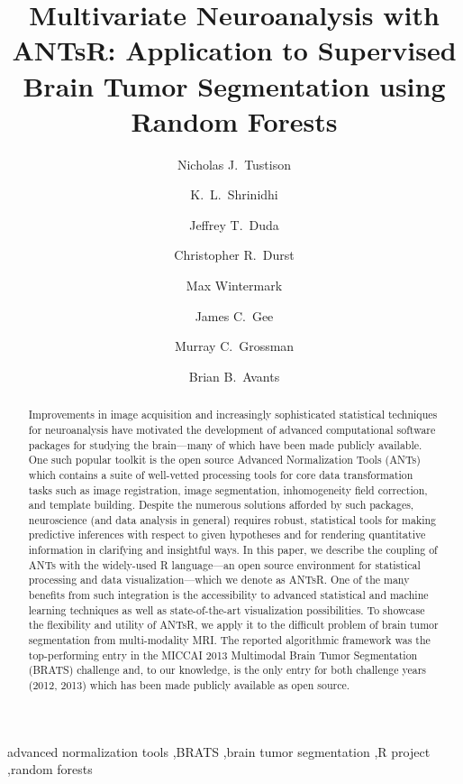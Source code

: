 \documentclass[final,5p,times,twocolumn]{elsarticle}
\begin{document}
\begin{frontmatter}

\title{Multivariate Neuroanalysis with ANTsR: Application to Supervised Brain Tumor Segmentation using Random Forests}

\author[label1]{Nicholas J.~Tustison
  }
\author[label2]{K.~L.~Shrinidhi}
\author[label2]{Jeffrey T.~Duda}
\author[label1]{Christopher R.~Durst}
\author[label1]{Max Wintermark}
\author[label1]{James C.~Gee}
\author[label1]{Murray C.~Grossman}
\author[label2]{Brian B.~Avants}
\address[label1]{Department of Radiology and Medical Imaging, University of Virginia, Charlottesville, VA}
\address[label2]{Penn Image Computing and Science Laboratory, University of Pennsylvania,
                Philadelphia, PA}


\linenumbers

\begin{abstract} 
Improvements in image acquisition and increasingly sophisticated statistical techniques 
for neuroanalysis have motivated the development of advanced computational software 
packages for studying the
brain---many of which
have been made publicly available.  One such popular toolkit is the open source Advanced
Normalization Tools (ANTs) which contains a suite of well-vetted processing tools for
core data transformation tasks such as image registration, image segmentation, 
inhomogeneity field correction, and template building.  Despite the numerous
solutions afforded by such packages, neuroscience (and data analysis in general) requires
robust, statistical tools for making predictive inferences with respect to given hypotheses
and for rendering quantitative information in clarifying and insightful ways.  
In this paper, we describe the
coupling of ANTs with the widely-used R language---an open source environment for 
statistical processing and data visualization---which we denote as ANTsR.  One of the
many benefits from such integration is the accessibility to advanced statistical 
and machine learning techniques as well as state-of-the-art visualization possibilities.  
To showcase the flexibility and utility of ANTsR, we 
apply it to the difficult problem of brain tumor segmentation from multi-modality
MRI.  The reported algorithmic framework was the top-performing entry in the MICCAI 2013 Multimodal 
Brain Tumor Segmentation (BRATS) challenge and, to our knowledge, is the only entry for
both challenge years (2012, 2013) which has been made publicly available as open source.
\end{abstract}

\begin{keyword}
advanced normalization tools \sep BRATS \sep brain tumor segmentation \sep R project \sep random forests
\end{keyword}

\end{frontmatter}
\end{document}
